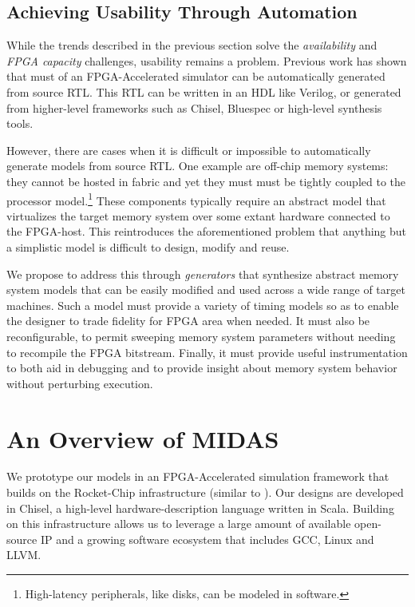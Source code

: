 \subsection{Achieving Usability Through Automation}

While the trends described in the previous section solve the \emph{availability} and \emph{FPGA
capacity} challenges, usability remains a problem. Previous work\cite{fabscalarfpga, strober} has
shown that must of an FPGA-Accelerated simulator can be automatically generated from source RTL. This
RTL can be written in an HDL like Verilog, or generated from higher-level frameworks such as
Chisel, Bluespec or high-level synthesis tools.

However, there are cases when it is difficult or impossible to automatically generate
models from source RTL. One example are off-chip memory systems: they cannot be hosted in
fabric and yet they must must be tightly coupled to the processor model.\footnote{High-latency peripherals, like disks, can be modeled in software.} These components typically require an abstract model that virtualizes the target memory system over some extant hardware connected to the FPGA-host. This reintroduces the aforementioned problem that anything but a simplistic model is difficult to design, modify and reuse.

We propose to address this through \emph{generators} that synthesize abstract memory system
models that can be easily modified and used across a wide range of target machines. Such a model
must provide a variety of timing models so as to enable the designer to trade fidelity
for FPGA area when needed. It must also be reconfigurable, to permit sweeping memory system
parameters without needing to recompile the FPGA bitstream. Finally, it must provide useful
instrumentation to both aid in debugging and to provide insight about memory system behavior
without perturbing execution.

\clearpage
\section{An Overview of MIDAS}

We prototype our models in an FPGA-Accelerated simulation framework that builds on
the Rocket-Chip \cite{rocketchip} infrastructure (similar to
\cite{strober}). Our designs are developed in Chisel, a high-level
hardware-description language written in Scala. Building on this infrastructure
allows us to leverage a large amount of available open-source IP and a growing
software ecosystem that includes GCC, Linux and LLVM.

